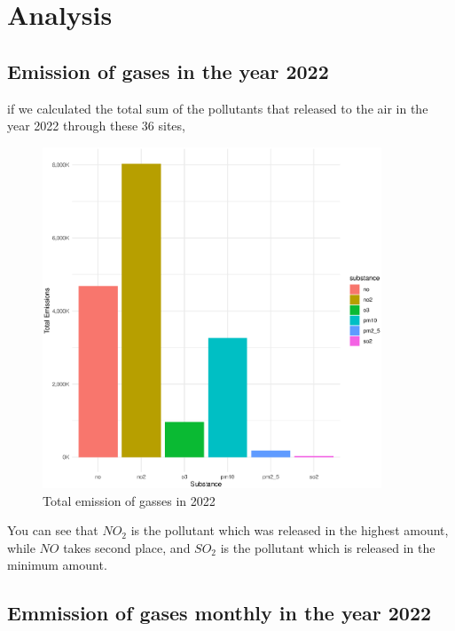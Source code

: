 \documentclass[]{article}
\begin{document}
\pagebreak

\section*{Analysis}

\vspace{12pt}

\subsection*{Emission of gases in the year 2022}

if we calculated the total sum of the pollutants that released to the air in the year 2022 through these 36 sites,

\begin{figure}[H]
	\centering
	\includegraphics[width=0.9\textwidth]{Graphs/yearly_graph_1.eps}
	\caption{Total emission of gasses in 2022}
	\label{fig:yearly gases}
\end{figure}

You can see that $NO_2$ is the pollutant which was released in the highest amount, while $NO$ takes second place, and $SO_2$ is the pollutant which is released in the minimum amount.


\pagebreak
\subsection*{Emmission of gases monthly in the year 2022}
\end{document}
